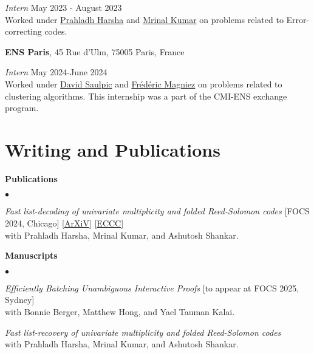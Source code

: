 \documentclass[margin,line, 10pt]{res}
\newenvironment{list2}{
  \begin{list}{$\bullet$}{%
      \setlength{\itemsep}{0in}
      \setlength{\parsep}{0in} \setlength{\parskip}{0in}
      \setlength{\topsep}{0in} \setlength{\partopsep}{0in} 
      \setlength{\leftmargin}{0.2in}}}{\end{list}}
\begin{document}
\begin{resume}
\vspace{-.3cm}
{\em Intern} \hfill {May 2023 - August 2023}\\
Worked under \href{https://www.tifr.res.in/~prahladh/}{Prahladh Harsha} and \href{https://mrinalkr.bitbucket.io/}{Mrinal Kumar} on problems related to Error-correcting codes.

{\bf ENS Paris}, 45 Rue d'Ulm, 75005 Paris, France

\vspace{-.3cm}
{\em Intern} \hfill {May 2024-June 2024}\\
Worked under \href{https://www.normalesup.org/~saulpic/}{David Saulpic} and \href{https://www.irif.fr/~magniez/}{Frédéric Magniez} on problems related to clustering algorithms. This internship was a part of the CMI-ENS exchange program.



\section{\sc Writing and Publications}


\vspace{-.1cm}

{\bf Publications}
\begin{list2}
    \item \textit{Fast list-decoding of univariate multiplicity and folded Reed-Solomon codes} [FOCS 2024, Chicago] [\href{https://arxiv.org/abs/2311.17841}{ArXiV}] [\href{https://eccc.weizmann.ac.il/report/2023/185/}{ECCC}]\\
     with Prahladh Harsha, Mrinal Kumar, and Ashutosh Shankar.
\end{list2}

{\bf Manuscripts}
\begin{list2}
    \item \textit{Efficiently Batching Unambiguous Interactive Proofs} \hfill [to appear at FOCS 2025, Sydney]\\
    with Bonnie Berger, Matthew Hong, and Yael Tauman Kalai. 
    \item \textit{Fast list-recovery of univariate multiplicity and folded Reed-Solomon codes}\\
    with Prahladh Harsha, Mrinal Kumar, and Ashutosh Shankar.
\end{list2}


\end{resume}
\end{document}

